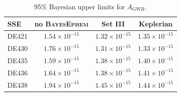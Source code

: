 \documentclass{aastex63}
\begin{document}
\begin{table}[ht]
    \begin{center}
    \caption{95\% Bayesian upper limits for $A_\mathrm{GWB}$.\label{tab:upper}}
    \begin{tabular}{l|c|c|c}
SSE & no \textsc{BayesEphem} & Set III & Keplerian \\
\hline
DE421 & $1.54 \times 10^{-15}$ & $1.32 \times 10^{-15}$ & $1.35 \times 10^{-15}$ \\
DE430 & $1.76 \times 10^{-15}$ & $1.31 \times 10^{-15}$ & $1.33 \times 10^{-15}$ \\
DE435 & $1.59 \times 10^{-15}$ & $1.38 \times 10^{-15}$ & $1.40 \times 10^{-15}$ \\
DE436 & $1.64 \times 10^{-15}$ & $1.38 \times 10^{-15}$ & $1.41 \times 10^{-15}$ \\
DE438 & $1.94 \times 10^{-15}$ & $1.45 \times 10^{-15}$ & $1.44 \times 10^{-15}$ \\
    \end{tabular}
    \end{center}
\end{table}
%
\end{document}
